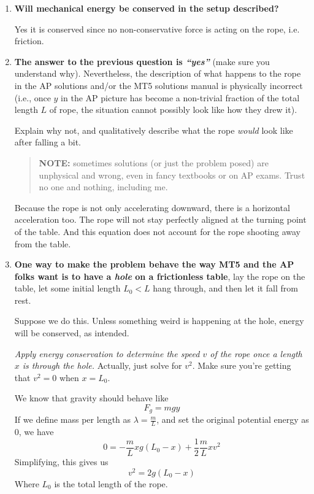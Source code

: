 \documentclass[12pt]{article}
\begin{document}
\begin{enumerate}
    \item \textbf{Will mechanical energy be conserved in the setup described?}

    Yes it is conserved since no non-conservative force is acting on the rope, i.e. friction. 
    
    

    \item \textbf{The answer to the previous question is \textit{“yes”}} (make sure you understand why). Nevertheless, the description of what happens to the rope in the AP solutions and/or the MT5 solutions manual is physically incorrect (i.e., once $y$ in the AP picture has become a non-trivial fraction of the total length $L$ of rope, the situation cannot possibly look like how they drew it).
    
    Explain why not, and qualitatively describe what the rope \textit{would} look like after falling a bit.
    
    \begin{quote}
    \textbf{NOTE:} sometimes solutions (or just the problem posed) are unphysical and wrong, even in fancy textbooks or on AP exams. Trust no one and nothing, including me.
    \end{quote}

    Because the rope is not only accelerating downward, there is a horizontal acceleration too. The rope will not stay perfectly aligned at the turning point of the table. And this equation does not account for the rope shooting away from the table. 
    
    \item \textbf{One way to make the problem behave the way MT5 and the AP folks want is to have a \textit{hole} on a frictionless table}, lay the rope on the table, let some initial length $L_0 < L$ hang through, and then let it fall from rest.
    
    Suppose we do this. Unless something weird is happening at the hole, energy will be conserved, as intended. 
    
    \textit{Apply energy conservation to determine the speed $v$ of the rope once a length $x$ is through the hole.} Actually, just solve for $v^2$. Make sure you’re getting that $v^2 = 0$ when $x = L_0$.

    We know that gravity should behave like
    \[
    F_g  = mgy
    \]
    If we define mass per length as $\lambda = \frac{m}{L}$, and set the original potential energy as $0$, we have
    \[
    0 = -\frac{m}{L}xg(L_0-x)+\frac{1}{2}\frac{m}{L}xv^2
    \]
    Simplifying, this gives us
    \[
    v^2 = 2g(L_0-x)
    \]
    Where $L_0$ is the total length of the rope. 


\end{enumerate}
\end{document}
